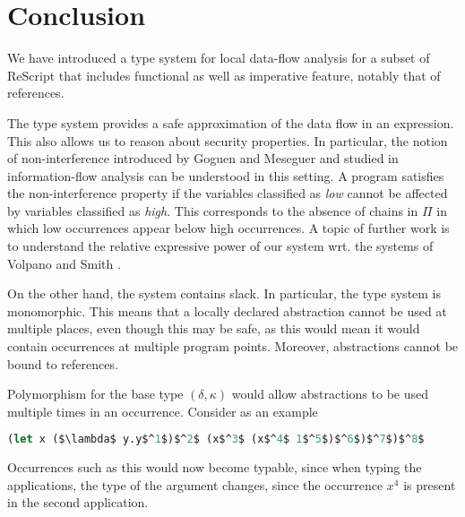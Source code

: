 \documentclass{llncs}
\begin{document}

% 

\section{Conclusion}\label{sec:Conc}

We have introduced a type system for local data-flow analysis for a
subset of ReScript that includes functional as well as imperative
feature, notably that of references.

The type system provides a safe approximation of the data flow in an
expression. This also allows us to reason about security
properties. In particular, the notion of non-interference introduced
by Goguen and Meseguer \cite{goguen-meseguer} and studied in information-flow analysis can be
understood in this setting. A program satisfies the non-interference
property if the variables classified as \emph{low} cannot be affected
by variables classified as \emph{high}. This corresponds to the
absence of chains in $\Pi$ in which low occurrences appear below high
occurrences. A topic of further work is to understand the relative
expressive power of our system wrt. the systems of Volpano and Smith
\cite{volpano-smith-96,volpano-smith-97}.

On the other hand, the system contains slack. In particular, the type
system is monomorphic. This means that a locally declared abstraction
cannot be used at multiple places, even though this may be safe, as
this would mean it would contain occurrences at multiple program
points. Moreover, abstractions cannot be bound to references.

Polymorphism for the base type $(\delta,\kappa)$ would allow 
abstractions to be used multiple times in an occurrence. Consider as
an example

\begin{lstlisting}[language=Caml, mathescape=true]
(let x ($\lambda$ y.y$^1$)$^2$ (x$^3$ (x$^4$ 1$^5$)$^6$)$^7$)$^8$
\end{lstlisting}

Occurrences such as this would now become typable,
since when typing the applications, the type of the argument changes,
since the occurrence $x^4$ is present in the second application. 
\end{document}

